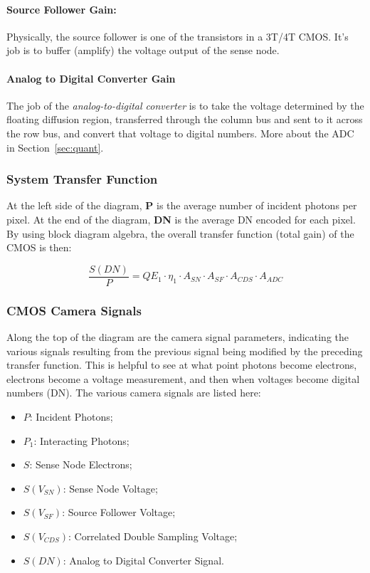 \documentclass[10pt]{article}
\begin{document}
\paragraph{Source Follower Gain:} Physically, the source follower is one of the transistors in a 3T/4T CMOS. It's job is to buffer (amplify) the voltage output of the sense node.

\paragraph{Analog to Digital Converter Gain}
The job of the \emph{analog-to-digital converter} is to take the voltage determined by the floating diffusion region, transferred through the column bus and sent to it across the row bus, and convert that voltage to digital numbers. More about the ADC in Section~\ref{sec:quant}.

\subsubsection{System Transfer Function}

At the left side of the diagram, \textbf{P} is the average number of incident photons per pixel. At the end of the diagram, \textbf{DN} is the average DN encoded for each pixel. By using block diagram algebra, the overall transfer function (total gain) of the CMOS is then:

$$\frac{S(DN)}{P}=QE_1 \cdot \eta_1 \cdot A_{SN} \cdot A_{SF} \cdot A_{CDS} \cdot A_{ADC}$$

\subsubsection{CMOS Camera Signals}

Along the top of the diagram are the camera signal parameters, indicating the various signals resulting from the previous signal being modified by the preceding transfer function. This is helpful to see at what point photons become electrons, electrons become a voltage measurement, and then when voltages become digital numbers (DN). The various camera signals are listed here:

\begin{itemize}[noitemsep]
\item \textbf{\boldmath$P$}: Incident Photons;
\item \textbf{\boldmath$P_1$}: Interacting Photons;
\item \textbf{\boldmath$S$}: Sense Node Electrons; 
\item \textbf{\boldmath$S(V_{SN})$}: Sense Node Voltage;
\item \textbf{\boldmath$S(V_{SF})$}: Source Follower Voltage;
\item \textbf{\boldmath$S(V_{CDS})$}: Correlated Double Sampling Voltage;
\item \textbf{\boldmath$S(DN)$}: Analog to Digital Converter Signal.
\end{itemize}
\end{document}

